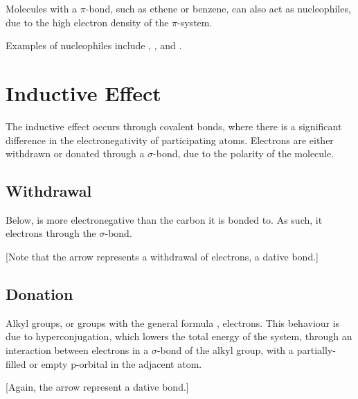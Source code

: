 			Molecules with a $\pi$-bond, such as ethene or benzene, can also act as nucleophiles, due to the high electron
			density of the $\pi$-system.

			Examples of nucleophiles include , , and .



	\section{Inductive Effect}

		The inductive effect occurs through covalent bonds, where there is a significant difference in the electronegativity of
		participating atoms. Electrons are either withdrawn or donated through a $\sigma$-bond, due to the polarity of the molecule.

		\subsection{Withdrawal}

			Below, \ch{\Cl} is more electronegative than the carbon it is bonded to. As such, it
			 electrons through the $\sigma$-bond.

			[Note that the arrow represents a withdrawal of electrons,  a dative bond.]


		\pagebreak
		\subsection{Donation}

			Alkyl groups, or groups with the general formula ,  electrons. This behaviour
			is due to hyperconjugation, which lowers the total energy of the system, through an interaction between electrons in a
			$\sigma$-bond of the alkyl group, with a partially-filled or empty p-orbital in the adjacent atom.


			[Again, the arrow  represent a dative bond.]



